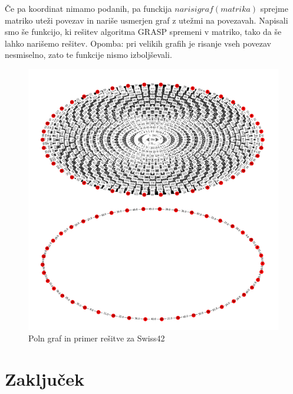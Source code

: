 \documentclass[12pt,a4paper]{amsart}
\theoremstyle{definition} %
\theoremstyle{plain} %
\begin{document}
Če pa koordinat nimamo podanih, pa funckija $narisigraf(matrika)$ sprejme matriko uteži povezav in nariše usmerjen graf z utežmi na povezavah. Napisali smo še funkcijo, ki rešitev algoritma GRASP spremeni v matriko, tako da še lahko narišemo rešitev. 
Opomba: pri velikih grafih je risanje vseh povezav nesmiselno, zato te funkcije nismo izboljševali.
\begin{figure}[H]
\caption{Poln graf in primer rešitve za Swiss42}
\centering
\includegraphics[scale =0.5]{swiss_primerjava}
\end{figure}
\pagebreak

\section{Zaključek}
\end{document}
